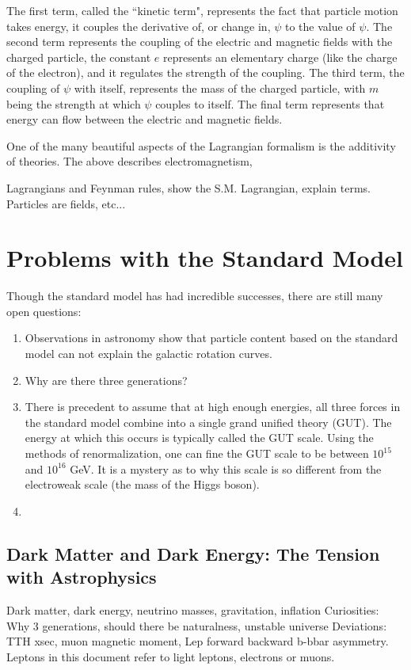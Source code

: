     The first term, called the ``kinetic term", represents the fact that particle motion takes energy, it couples the derivative of, or change in, $\psi$ to the value of $\psi$. The second term represents the coupling of the electric and magnetic fields with the charged particle, the constant $e$ represents an elementary charge (like the charge of the electron), and it regulates the strength of the coupling. The third term, the coupling of $\psi$ with itself, represents the mass of the charged particle, with $m$ being the strength at which $\psi$ couples to itself. The final term represents that energy can flow between the electric and magnetic fields.

    One of the many beautiful aspects of the Lagrangian formalism is the additivity of theories. The above describes electromagnetism, 

    Lagrangians and Feynman rules, show the S.M. Lagrangian, explain terms. Particles are fields, etc...
\section{Problems with the Standard Model} \label{sec:problems_with_sm}
  Though the standard model has had incredible successes, there are still many open questions:
  \begin{enumerate}
    \item Observations in astronomy show that particle content based on the standard model can not explain the galactic rotation curves.
    \item Why are there three generations?
    \item There is precedent to assume that at high enough energies, all three forces in the standard model combine into a single grand unified theory (GUT). The energy at which this occurs is typically called the GUT scale. Using the methods of renormalization, one can fine the GUT scale to be between $10^15$ and $10^16$ GeV. It is a mystery as to why this scale is so different from the electroweak scale (the mass of the Higgs boson).
    \item
  \end{enumerate}
  
  \subsection{Dark Matter and Dark Energy: The Tension with Astrophysics}
      Dark matter, dark energy, neutrino masses, gravitation, inflation
      Curiosities: Why 3 generations, should there be naturalness, unstable universe
      Deviations: TTH xsec, muon magnetic moment, Lep forward backward b-bbar asymmetry.
      Leptons in this document refer to light leptons, electrons or muons.
